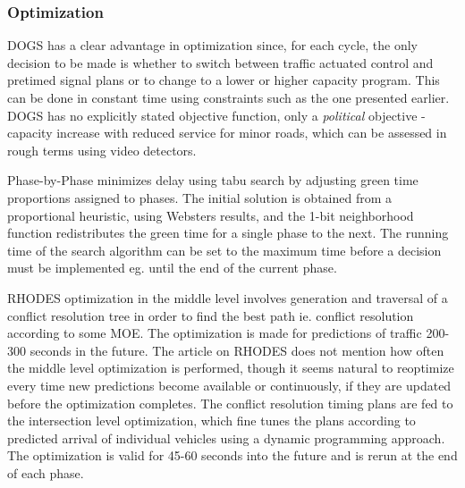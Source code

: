 \subsubsection*{Optimization}

DOGS has a clear advantage in optimization since, for each cycle, the
only decision to be made is whether to switch between traffic actuated
control and pretimed signal plans or to change to a lower or higher
capacity program. This can be done in constant time using constraints
such as the one presented earlier. DOGS has no explicitly stated
objective function, only a \textit{political} objective - capacity
increase with reduced service for minor roads, which can be assessed
in rough terms using video detectors.

Phase-by-Phase minimizes delay using tabu search by adjusting green
time proportions assigned to phases. The initial solution is obtained
from a proportional heuristic, using Websters results, and the 1-bit
neighborhood function redistributes the green time for a single phase
to the next.  The running time of the search algorithm can be set to
the maximum time before a decision must be implemented eg. until the
end of the current phase.

RHODES optimization in the middle level involves generation and
traversal of a conflict resolution tree in order to find the best path
ie. conflict resolution according to some MOE. The optimization is
made for predictions of traffic 200-300 seconds in the future. The
article on RHODES does not mention how often the middle level
optimization is performed, though it seems natural to reoptimize every
time new predictions become available or continuously, if they are
updated before the optimization completes.  The conflict resolution
timing plans are fed to the intersection level optimization, which
fine tunes the plans according to predicted arrival of individual
vehicles using a dynamic programming approach. The optimization is
valid for 45-60 seconds into the future and is rerun at the end of
each phase.
